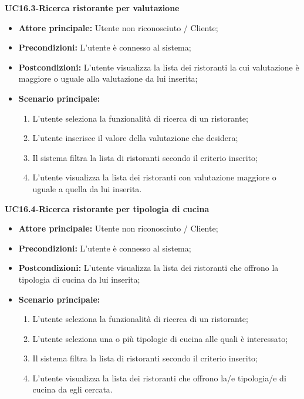 \textbf{UC16.3-Ricerca ristorante per valutazione}
\begin{itemize}
\item \textbf{Attore principale:} Utente non riconosciuto / Cliente;
\item \textbf{Precondizioni:} L'utente è connesso al sistema;
\item \textbf{Postcondizioni:} L'utente visualizza la lista dei ristoranti la cui valutazione è maggiore o uguale alla valutazione da lui inserita;
\item \textbf{Scenario principale:}
\begin{enumerate}
    \item L'utente seleziona la funzionalità di ricerca di un ristorante;
    \item L'utente inserisce il valore della valutazione che desidera;
    \item Il sistema filtra la lista di ristoranti secondo il criterio inserito;
    \item L'utente visualizza la lista dei ristoranti con valutazione maggiore o uguale a quella da lui inserita.
\end{enumerate}
\end{itemize}

\pagebreak

\textbf{UC16.4-Ricerca ristorante per tipologia di cucina}
\begin{itemize}
\item \textbf{Attore principale:} Utente non riconosciuto / Cliente;
\item \textbf{Precondizioni:} L'utente è connesso al sistema;
\item \textbf{Postcondizioni:} L'utente visualizza la lista dei ristoranti che offrono la tipologia di cucina da lui inserita;
\item \textbf{Scenario principale:}
\begin{enumerate}
    \item L'utente seleziona la funzionalità di ricerca di un ristorante;
    \item L'utente seleziona una o più tipologie di cucina alle quali è interessato;
    \item Il sistema filtra la lista di ristoranti secondo il criterio inserito;
    \item L'utente visualizza la lista dei ristoranti che offrono la/e tipologia/e di cucina da egli cercata.
\end{enumerate}
\end{itemize}

